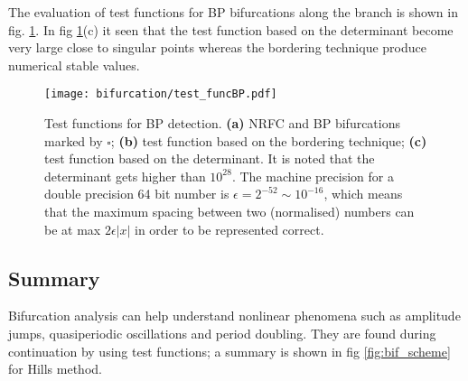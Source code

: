 The evaluation of test functions for BP bifurcations along the branch is shown
in fig. \ref{fig:bif_BPtestfunction}. In fig \ref{fig:bif_BPtestfunction}(c) it
seen that the test function based on the determinant become very large close to
singular points whereas the bordering technique produce numerical stable values.

\begin{figure}[ht!]
  \centering
  \texttt{[image: bifurcation/test\_funcBP.pdf]}
  \caption{Test functions for BP detection.
    \textbf{(a)} NRFC and BP bifurcations marked by $\square$;
    \textbf{(b)} test function based on the bordering technique;
    \textbf{(c)} test function based on the determinant. It is noted that the
    determinant gets higher than $10^{28}$. The machine precision for a
    double precision 64 bit number is $\epsilon = 2^{-52} \sim 10^{-16}$,
    which means that the maximum spacing between two (normalised) numbers can be
    at max $2\epsilon |x|$ in order to be represented correct.}
  \label{fig:bif_BPtestfunction}
\end{figure}

\subsection{Summary}
\label{sec:bif_summary}

Bifurcation analysis can help understand nonlinear phenomena such as amplitude
jumps, quasiperiodic oscillations and period doubling. They are found during
continuation by using test functions; a summary is shown in fig
\ref{fig:bif_scheme} for Hills method.

